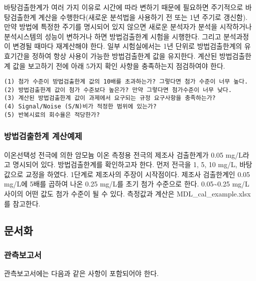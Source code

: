 \documentclass[
]{book}
\begin{document}
바탕검출한계가 여러 가지 이유로 시간에 따라 변하기 때문에 필요하면 주기적으로 바탕검출한계 계산을 수행한다(새로운 분석법을 사용하기 전 또는 1년 주기로 갱신함). 만약 방법에 특정한 주기를 명시되어 있지 않으면 새로운 분석자가 분석을 시작하거나 분석시스템의 성능이 변하거나 하면 방법검출한계 시험을 시행한다. 그리고 분석과정이 변경될 때마다 재계산해야 한다. 일부 시험실에서는 1년 단위로 방법검출한계의 유효기간을 정하여 항상 사용이 가능한 방법검출한계 값을 유지한다.
계산된 방법검출한계 값을 보고하기 전에 아래 5가지 확인 사항을 충족하는지 점검하여야 한다.

\begin{verbatim}
(1) 첨가 수준이 방법검출한계 값의 10배를 초과하는가? 그렇다면 첨가 수준이 너무 높다.  
(2) 방법검출한계 값이 첨가 수준보다 높은가? 만약 그렇다면 첨가수준이 너무 낮다.  
(3) 계산된 방법검출한계 값이 과제에서 요구되는 규정 요구사항을 충족하는가?  
(4) Signal/Noise (S/N)비가 적정한 범위에 있는가?  
(5) 반복시료의 회수율은 적당한가?    
\end{verbatim}

\hypertarget{uxbc29uxbc95uxac80uxcd9cuxd55cuxacc4-uxacc4uxc0b0uxc608uxc81c}{%
\subsubsection{방법검출한계 계산예제}\label{uxbc29uxbc95uxac80uxcd9cuxd55cuxacc4-uxacc4uxc0b0uxc608uxc81c}}

이온선택성 전극에 의한 암모늄 이온 측정용 전극의 제조사 검출한계가 0.05 mg/L라고 명시되어 있다. 방법검출한계를 확인하고자 한다. 먼저 전극을 1, 5, 10 mg/L, 바탕값으로 교정을 하였다. 1단계로 제조사의 주장이 시작점이다. 제조사 검출한계인 0.05 mg/L에 5배를 곱하여 나온 0.25 mg/L를 초기 첨가 수준으로 한다. 0.05\textasciitilde0.25 mg/L사이의 어떤 값도 첨가 수준이 될 수 있다. 측정값과 계산은 MDL\_cal\_example.xlsx를 참고한다.

\hypertarget{uxbb38uxc11cuxd654}{%
\subsection{문서화}\label{uxbb38uxc11cuxd654}}

\hypertarget{uxad00uxce21uxbcf4uxace0uxc11c}{%
\subsubsection{관측보고서}\label{uxad00uxce21uxbcf4uxace0uxc11c}}

관측보고서에는 다음과 같은 사항이 포함되어야 한다.
\end{document}
